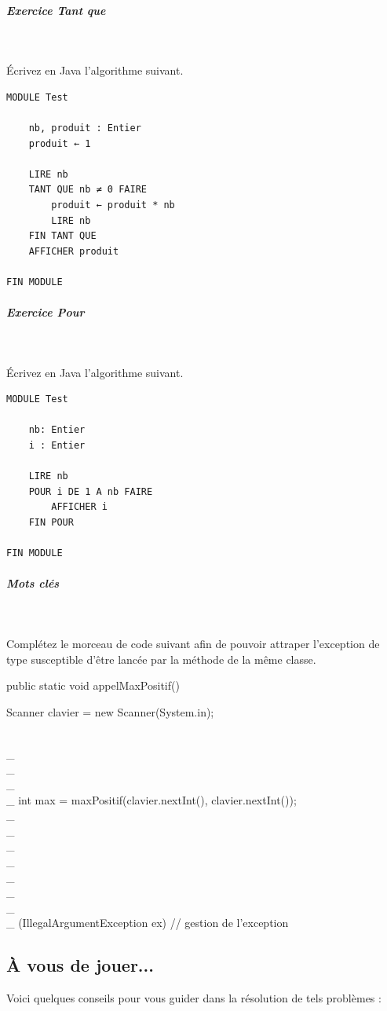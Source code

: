 \documentclass[11pt,a4paper]{article}
\begin{document}
		\subparagraph{Exercice Tant que} 
		
					\textcolor{white}{.} \par
				
					\'Ecrivez en Java l'algorithme suivant.
				
            \par
        \begin{verbatim}
MODULE Test

    nb, produit : Entier
    produit ← 1 

    LIRE nb
    TANT QUE nb ≠ 0 FAIRE
        produit ← produit * nb
        LIRE nb 
    FIN TANT QUE
    AFFICHER produit
    
FIN MODULE
			    \end{verbatim}
			
		\subparagraph{Exercice Pour} 
		
					\textcolor{white}{.} \par
				
					\'Ecrivez en Java l'algorithme suivant.
				
            \par
        \begin{verbatim}
MODULE Test

    nb: Entier
    i : Entier

    LIRE nb
    POUR i DE 1 A nb FAIRE
        AFFICHER i
    FIN POUR

FIN MODULE
			     \end{verbatim}
			
		\subparagraph{Mots cl\'es} 
		
                \textcolor{white}{.} \par
            
							Compl\'etez le morceau de code suivant afin de pouvoir attraper l'exception de type \verb@IllegalArgumentException@ 
							susceptible d'\^etre lanc\'ee par la m\'ethode \verb@maxPositif@ de la m\^eme classe.
						\clearpage\begin{Java}
public static void appelMaxPositif() {

    Scanner clavier = new Scanner(System.in);
    
     \\_\\_\\_\\_  {
        int max = maxPositif(clavier.nextInt(), clavier.nextInt());
    }  \\_\\_\\_\\_\\_\\_\\_\\_  (IllegalArgumentException ex) {
        // gestion de l'exception
    }
    
}
							\end{Java}\subsection{\`A vous de jouer...}
          Voici quelques conseils pour vous guider dans la r\'esolution de tels probl\`emes :
          
\end{document}
